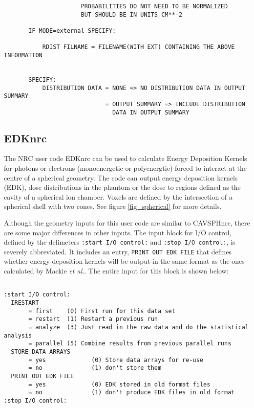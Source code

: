 \documentclass[12pt,twoside]{article}  %
\begin{document}
\begin{verbatim}
                      PROBABILITIES DO NOT NEED TO BE NORMALIZED
                      BUT SHOULD BE IN UNITS CM**-2

       IF MODE=external SPECIFY:

           RDIST FILNAME = FILENAME(WITH EXT) CONTAINING THE ABOVE INFORMATION


       SPECIFY:
           DISTRIBUTION DATA = NONE => NO DISTRIBUTION DATA IN OUTPUT SUMMARY
                             = OUTPUT SUMMARY => INCLUDE DISTRIBUTION
                               DATA IN OUTPUT SUMMARY
\end{verbatim}

\subsection{EDKnrc}

The NRC user code EDKnrc can be used to calculate Energy Deposition Kernels
for photons or electrons (monoenergetic or polyenergtic) forced to interact
at the centre of a spherical
geometry\cite{Ma05}.  The code can output energy deposition kernels (EDK),
dose distributions in the phantom or the dose to regions defined as the
cavity of a spherical ion chamber.  Voxels are defined by the intersection
of a spherical shell with two cones. See figure \ref{fig_spherical}
for more details.

Although the geometry inputs for this user code are similar to CAVSPHnrc,
there are some major differences in other inputs. The input block for I/O
control, defined by the delimeters {\tt :start I/O control:} and
{\tt:stop I/O control:}, is severely abbreviated.  It includes an entry,
{\tt PRINT OUT EDK FILE} that defines whether energy deposition
kernels will be output in the same format as the ones calculated by
Mackie {\it et al.}\cite{Ma88}. The entire input for this block
is shown below:

\begin{verbatim}

:start I/O control:
  IRESTART
       = first    (0) First run for this data set
       = restart  (1) Restart a previous run
       = analyze  (3) Just read in the raw data and do the statistical analysis
       = parallel (5) Combine results from previous parallel runs
  STORE DATA ARRAYS
       = yes             (0) Store data arrays for re-use
       = no              (1) don't store them
  PRINT OUT EDK FILE
       = yes             (0) EDK stored in old format files
       = no              (1) don't produce EDK files in old format
:stop I/O control:
\end{verbatim}
\end{document}
